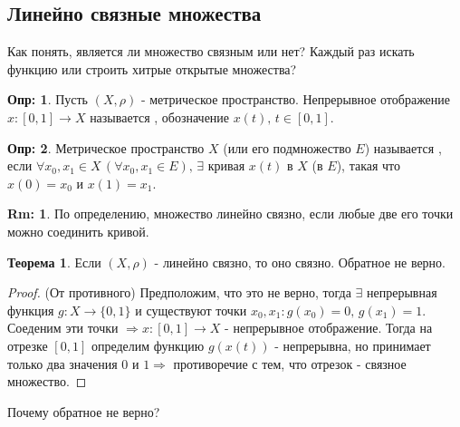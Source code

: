 \documentclass[12pt]{article}
\theoremstyle{definition}
\newtheorem{defn}{Опр:}
\newtheorem{rem}{Rm:}
\newtheorem{theorem}{Теорема}
\begin{document}
\subsection*{Линейно связные множества}
Как понять, является ли множество связным или нет? Каждый раз искать функцию или строить хитрые открытые множества?

\begin{defn}
	Пусть $(X,\rho)$ - метрическое пространство. Непрерывное отображение $x \colon [0,1] \to X$ называется , обозначение $x(t), \, t \in [0,1]$.
\end{defn} 
\begin{defn}
	Метрическое пространство $X$ (или его подмножество $E$) называется , если $\forall x_0, x_1 \in X \, (\forall x_0, x_1 \in E), \, \exists$ кривая $x(t)$ в $X$ (в $E$), такая что $x(0) = x_0$ и $x(1) = x_1$.
\end{defn}
\begin{rem}
	По определению, множество линейно связно, если любые две его точки можно соединить кривой.
\end{rem}
\begin{theorem}
	Если $(X,\rho)$ - линейно связно, то оно связно. Обратное не верно.
\end{theorem}
\begin{proof}
	(От противного) Предположим, что это не верно, тогда $\exists$ непрерывная функция $g \colon X \to \{0,1\}$ и существуют точки $x_0, x_1 \colon g(x_0) = 0, \, g(x_1) = 1$. Соеденим эти точки $\Rightarrow x\colon [0,1] \rightarrow X$  - непрерывное отображение. Тогда на отрезке $[0,1]$ определим функцию $g(x(t))$ - непрерывна, но принимает только два значения $0$ и $1 \Rightarrow$ противоречие с тем, что отрезок - связное множество.
\end{proof}

Почему обратное не верно?
\end{document}

